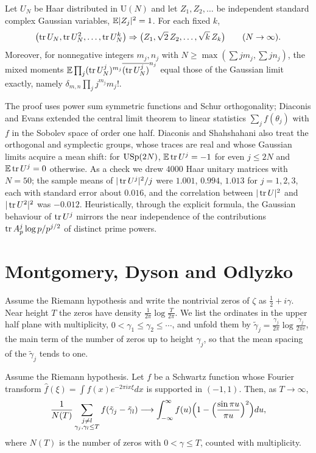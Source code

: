 \begin{theorem}\label{thm:ch6ds}
Let $U_N$ be Haar distributed in $\mathrm{U}(N)$ and let $Z_1,Z_2,\dots$ be independent standard complex Gaussian variables, $\mathbb{E}|Z_j|^2=1$. For each fixed $k$,
\[
\bigl(\operatorname{tr} U_N,\operatorname{tr} U_N^2,\dots,\operatorname{tr} U_N^k\bigr)\Rightarrow\bigl(Z_1,\sqrt2\,Z_2,\dots,\sqrt k\,Z_k\bigr)\qquad(N\to\infty).
\]
Moreover, for nonnegative integers $m_j,n_j$ with $N\ge\max(\sum jm_j,\sum jn_j)$, the mixed moments $\mathbb{E}\prod_j(\operatorname{tr} U_N^j)^{m_j}\overline{(\operatorname{tr} U_N^j)}^{n_j}$ equal those of the Gaussian limit exactly, namely $\delta_{m,n}\prod_jj^{m_j}m_j!$.
\end{theorem}

The proof uses power sum symmetric functions and Schur orthogonality; Diaconis and Evans \cite{diaconisevans2001} extended the central limit theorem to linear statistics $\sum_jf(\theta_j)$ with $f$ in the Sobolev space of order one half. Diaconis and Shahshahani also treat the orthogonal and symplectic groups, whose traces are real and whose Gaussian limits acquire a mean shift: for $\mathrm{USp}(2N)$, $\mathbb{E}\operatorname{tr} U^j=-1$ for even $j\le2N$ and $\mathbb{E}\operatorname{tr} U^j=0$ otherwise. As a check we drew $4000$ Haar unitary matrices with $N=50$; the sample means of $|\operatorname{tr} U^j|^2/j$ were $1.001$, $0.994$, $1.013$ for $j=1,2,3$, each with standard error about $0.016$, and the correlation between $|\operatorname{tr} U|^2$ and $|\operatorname{tr} U^2|^2$ was $-0.012$. Heuristically, through the explicit formula, the Gaussian behaviour of $\operatorname{tr} U^j$ mirrors the near independence of the contributions $\operatorname{tr} A_p^j\log p/p^{j/2}$ of distinct prime powers.

\section{Montgomery, Dyson and Odlyzko}\label{sec:ch6mont}

Assume the Riemann hypothesis and write the nontrivial zeros of $\zeta$ as $\frac12+i\gamma$. Near height $T$ the zeros have density $\frac{1}{2\pi}\log\frac{T}{2\pi}$. We list the ordinates in the upper half plane with multiplicity, $0<\gamma_1\le\gamma_2\le\cdots$, and unfold them by $\tilde\gamma_j=\frac{\gamma_j}{2\pi}\log\frac{\gamma_j}{2\pi e}$, the main term of the number of zeros up to height $\gamma_j$, so that the mean spacing of the $\tilde\gamma_j$ tends to one.

\begin{theorem}\label{thm:ch6mont}
Assume the Riemann hypothesis. Let $f$ be a Schwartz function whose Fourier transform $\hat f(\xi)=\int f(x)e^{-2\pi ix\xi}dx$ is supported in $(-1,1)$. Then, as $T\to\infty$,
\[
\frac{1}{N(T)}\sum_{\substack{j\ne l\\ \gamma_j,\gamma_l\le T}}f(\tilde\gamma_j-\tilde\gamma_l)\longrightarrow\int_{-\infty}^{\infty}f(u)\Bigl(1-\Bigl(\frac{\sin\pi u}{\pi u}\Bigr)^2\Bigr)du ,
\]
where $N(T)$ is the number of zeros with $0<\gamma\le T$, counted with multiplicity.
\end{theorem}

